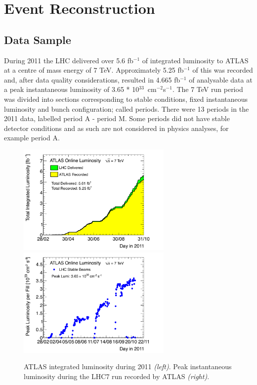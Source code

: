 \chapter{Event Reconstruction}

\section{Data Sample}

During 2011 the LHC delivered over 5.6 fb$^{-1}$ of integrated luminosity to ATLAS at a centre of mass energy of 7 TeV. Approximately 5.25 fb$^{-1}$ of this was recorded and, after data quality considerations, resulted in 4.665 fb$^{-1}$ of analysable data at a peak instantaneous luminosity of 3.65 * 10$^{33}$~cm$^{-2}$s$^{-1}$. The 7 TeV run period was divided into sections corresponding to stable conditions, fixed instantaneous luminosity and bunch configuration; called periods. There were 13 periods in the 2011 data, labelled period A - period M. Some periods did not have stable detector conditions and as such are not considered in physics analyses, for example period A.

\begin{figure}[htbp!]
\begin{center}
\includegraphics[width=75mm]{f/sumLumiByDay}
\includegraphics[width=75mm]{f/peakLumiByFill}
\end{center}
\caption{ATLAS integrated luminosity during 2011 \textit{(left)}. Peak instantaneous luminosity during the LHC7 run recorded by ATLAS \textit{(right)}.}
\label{fig:lumi}
\end{figure}

